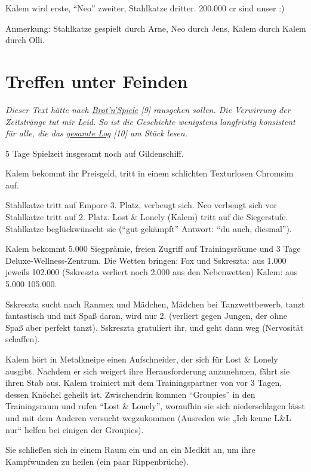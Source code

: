 \documentclass[11pt]{article}
\begin{document}
Kalem wird erste, ``Neo'' zweiter, Stahlkatze dritter. 200.000 cr sind
unser :)

Anmerkung: Stahlkatze gespielt durch Arne, Neo durch Jens, Kalem durch
Kalem durch Olli.

\section{Treffen unter Feinden}

\emph{Dieser Text hätte nach
\href{http://1w6.org/deutsch/kampagnen/waechter-der-zeit/gedaechtniskristall/brot-n-spiele}{Brot'n'Spiele}
{[}9{]} rausgehen sollen. Die Verwirrung der Zeitstränge tut mir Leid.
So ist die Geschichte wenigstens langfristig konsistent für alle, die
das
\href{http://1w6.org/deutsch/kampagnen/friedenszwang/aufzeichnungen/sskreszta-log}{gesamte
Log} {[}10{]} am Stück lesen.}

5 Tage Spielzeit insgesamt noch auf Gildenschiff.

Kalem bekommt ihr Preisgeld, tritt in einem schlichten Texturlosen
Chromsim auf.

Stahlkatze tritt auf Empore 3. Platz, verbeugt sich. Neo verbeugt sich
vor Stahlkatze tritt auf 2. Platz. Lost \& Lonely (Kalem) tritt auf die
Siegerstufe. Stahlkatze beglückwünscht sie (``gut gekämpft'' Antwort:
``du auch, diesmal'').

Kalem bekommt 5.000 Siegprämie, freien Zugriff auf Trainingsräume und 3
Tage Deluxe-Wellness-Zentrum. Die Wetten bringen: Fox und Sskreszta: aus
1.000 jeweils 102.000 (Sskreszta verliert noch 2.000 aus den
Nebenwetten) Kalem: aus 5.000 105.000.

Sskreszta sucht nach Ranmex und Mädchen, Mädchen bei Tanzwettbewerb,
tanzt fantastisch und mit Spaß daran, wird nur 2. (verliert gegen
Jungen, der ohne Spaß aber perfekt tanzt). Sskreszta gratuliert ihr, und
geht dann weg (Nervosität schaffen).

Kalem hört in Metalkneipe einen Aufschneider, der sich für Lost \&
Lonely ausgibt. Nachdem er sich weigert ihre Herausforderung anzunehmen,
fährt sie ihren Stab aus. Kalem trainiert mit dem Trainingspartner von
vor 3 Tagen, dessen Knöchel geheilt ist. Zwischendrin kommen
``Groupies'' in den Trainingsraum und rufen ``Lost \& Lonely'',
woraufhin sie sich niederschlagen lässt und mit dem Anderen versucht
wegzukommen (Ausreden wie „Ich kenne L\&L nur`` helfen bei einigen der
Groupies).

Sie schließen sich in einem Raum ein und an ein Medkit an, um ihre
Kampfwunden zu heilen (ein paar Rippenbrüche).
\end{document}
